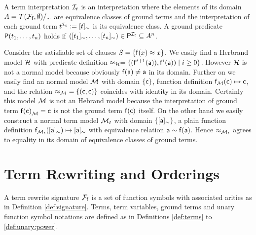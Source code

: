 \begin{definition}
	A {\myem term interpretation}
	$\mathcal{I}_t$
	is an interpretation
	where the elements of its domain $A = {\mathcal{T}(\mathcal{F}_{\mathsf{f}},\emptyset)}/_\sim$
	are equivalence classes of ground terms
	and the interpretation of each ground term $t^{\mathcal{I}_t} := [t]_\sim$ is its equivalence class.
	A ground predicate $\mathsf{P}(t_1,\ldots,t_n)$ holds if
	$([t_1]_\sim,\ldots,[t_n]_\sim) \in \mathsf{P}^{\mathcal{I}_t} \subseteq A^n$.
\end{definition}


\begin{example}
	Consider the satisfiable set of clauses $S = \{ \mathsf{f}(x) \approx x \}$.
	We easily find a Herbrand model $\mathcal{H}$ with
	predicate definition $\approx_{\mathcal{H}} = \{ (\mathsf{f}^{i+1}(\mathsf{a})), \mathsf{f}^{i}(\mathsf{a})) \mid i\geq 0  \} $.
	However $\mathcal{H}$ is not a normal model because obviously $\mathsf{f}(\mathsf{a})\neq\mathsf{a}$ in its domain.
	Further on we easily find an normal model $\mathcal{M}$
	with domain $\{ \mathsf{c} \}$, function definition $\mathsf{f}_{\mathcal{M}}(\mathsf{c}) \mapsto \mathsf{c}$,
	and the relation ${\approx_{\mathcal{M}}} = \{ (\mathsf{c},\mathsf{c})\}$ coincides with identity in its domain.
	Certainly this model $\mathcal{M}$ is not an Hebrand model
	because the interpretation of ground term ${\mathsf{f}(\mathsf{c})}_{\mathcal{M}} = \mathsf{c}$ is not the ground term $\mathsf{f}(\mathsf{c})$ itself.
	On the other hand we easily construct a normal term model $\mathcal{M}_t$ with domain $\{ [\mathsf{a}]_\sim\}$,
	a plain function definition
	$\mathsf{f}_{\mathcal{M}_t}([\mathsf{a}]_\sim) \mapsto [\mathsf{a}]_\sim$
	with equivalence relation
	$\mathsf{a} \sim \mathsf{f}(\mathsf{a})$.
	Hence $\approx_{\mathcal{M}_t}$ agrees to equality in its domain of equivalence classes of ground terms.
\end{example}



\section{Term Rewriting and Orderings}\label{sec:termrewriting}

\begin{definition}\label{def:rewrite:signature}
	A term rewrite signature ${\mathcal{F}_{\mathsf{f}}}$ is a set of function symbols
	with associated arities
	as in Definition \ref{def:signature}.
	Terms, term variables, ground terms and unary function symbol notations
	are defined as in Definitions \ref{def:terms} to \ref{def:unary:power}.
\end{definition}


